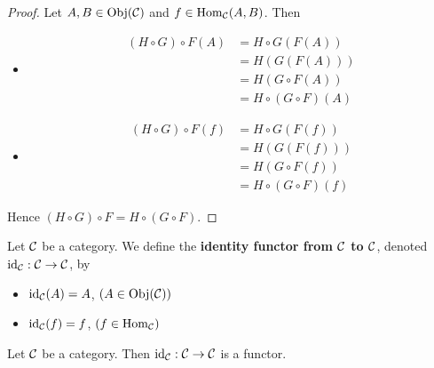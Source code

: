 \documentclass{book}
\begin{document}
	\begin{proof}
		Let $A, B \in \operatorname{Obj}(\mathcal{C})$ and $f \in \operatorname{Hom}_{\mathcal{C}}(A,B)$. Then 
		\begin{itemize}
				\item 
				\begin{align*}
					(H \circ G) \circ F(A) 
					& = H \circ G (F(A)) \\
					& = H (G(F(A))) \\
					& = H( G \circ F (A)) \\
					& = H \circ (G \circ F) (A)
				\end{align*}
				\item  
				\begin{align*}
					(H \circ G) \circ F(f) 
					& = H \circ G (F(f)) \\
					& = H (G(F(f))) \\
					& = H( G \circ F (f)) \\
					& = H \circ (G \circ F) (f)
				\end{align*}
		\end{itemize}
		Hence $(H \circ G) \circ F = H \circ (G \circ F)$.
	\end{proof}

	\begin{defn} 
		Let $\mathcal{C}$ be a category. We define the \textbf{identity functor from $\mathcal{C}$ to $\mathcal{C}$}, denoted $\operatorname{id}_{\mathcal{C}}: \mathcal{C} \rightarrow \mathcal{C}$, by 
		\begin{itemize}
			\item $\operatorname{id}_{\mathcal{C}}(A) = A$, $(A \in \operatorname{Obj}(\mathcal{C}))$
			\item $\operatorname{id}_{\mathcal{C}}(f) = f$, $(f \in \operatorname{Hom}_{\mathcal{C}})$
		\end{itemize}
	\end{defn}
	
	\begin{ex}  
		Let $\mathcal{C}$ be a category. Then $\operatorname{id}_{\mathcal{C}}: \mathcal{C} \rightarrow \mathcal{C}$ is a functor.
	\end{ex}
	
\end{document}
